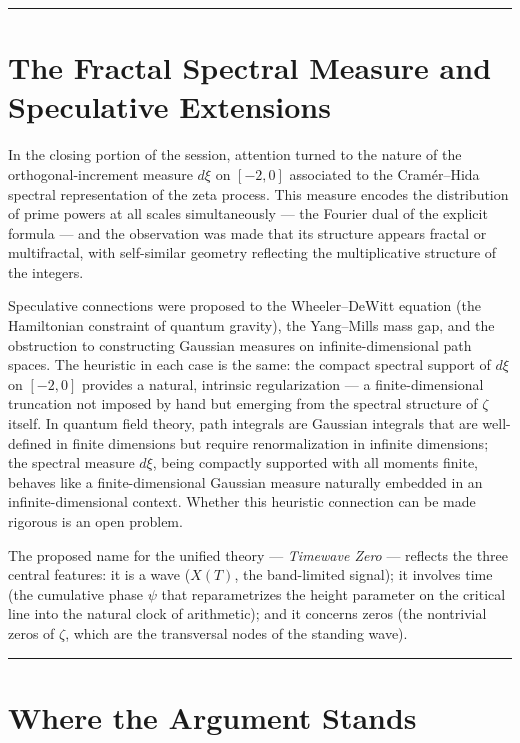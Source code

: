 \documentclass[12pt]{article}
\begin{document}
\bigskip
\hrule
\bigskip

\section{The Fractal Spectral Measure and Speculative Extensions}

In the closing portion of the session, attention turned to the nature of the
orthogonal-increment measure $d\xi$ on $[-2,0]$ associated to the Cram\'{e}r--Hida
spectral representation of the zeta process. This measure encodes the distribution of
prime powers at all scales simultaneously --- the Fourier dual of the explicit formula
--- and the observation was made that its structure appears fractal or multifractal,
with self-similar geometry reflecting the multiplicative structure of the integers.

Speculative connections were proposed to the Wheeler--DeWitt equation (the Hamiltonian
constraint of quantum gravity), the Yang--Mills mass gap, and the obstruction to
constructing Gaussian measures on infinite-dimensional path spaces. The heuristic in
each case is the same: the compact spectral support of $d\xi$ on $[-2,0]$ provides a
natural, intrinsic regularization --- a finite-dimensional truncation not imposed by
hand but emerging from the spectral structure of $\zeta$ itself. In quantum field
theory, path integrals are Gaussian integrals that are well-defined in finite dimensions
but require renormalization in infinite dimensions; the spectral measure $d\xi$, being
compactly supported with all moments finite, behaves like a finite-dimensional Gaussian
measure naturally embedded in an infinite-dimensional context. Whether this heuristic
connection can be made rigorous is an open problem.

The proposed name for the unified theory --- \textit{Timewave Zero} --- reflects the
three central features: it is a wave ($X(T)$, the band-limited signal); it involves
time (the cumulative phase $\psi$ that reparametrizes the height parameter on the
critical line into the natural clock of arithmetic); and it concerns zeros (the
nontrivial zeros of $\zeta$, which are the transversal nodes of the standing wave).

\bigskip
\hrule
\bigskip

\section{Where the Argument Stands}
\end{document}
